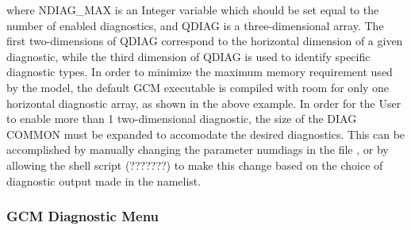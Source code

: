 where NDIAG\_MAX is an Integer variable which should be
set equal to the number of enabled diagnostics, and QDIAG is a three-dimensional
array.  The first two-dimensions of QDIAG correspond to the horizontal dimension
of a given diagnostic, while the third dimension of QDIAG is used to identify
specific diagnostic types.
In order to minimize the maximum memory requirement used by the model,
the default GCM executable is compiled with room for only one horizontal
diagnostic array, as shown in the above example.  
In order for the User to enable more than 1 two-dimensional diagnostic,
the size of the DIAG COMMON must be expanded to accomodate the desired diagnostics.
This can be accomplished by manually changing the parameter numdiags in the
file , or by allowing the 
shell script (???????) to make this
change based on the choice of diagnostic output made in the namelist.

\newpage

\subsubsection{GCM Diagnostic Menu}
\label{sec:diagnostics:menu}

